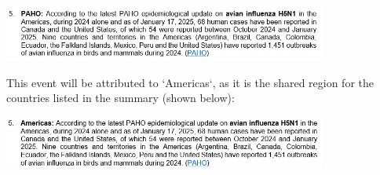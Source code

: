 \documentclass[a4paper,12pt]{article}
\begin{document}
\begin{center}
    \includegraphics[width=0.8\textwidth]{images/dr_entry_250128_5.png}
\end{center}

This event will be attributed to `Americas`, as it is the shared region for the countries listed in the summary (shown below):

\begin{center}
    \includegraphics[width=0.8\textwidth]{images/dr_entry_250128_5_corrected.png}
\end{center}
\end{document}
